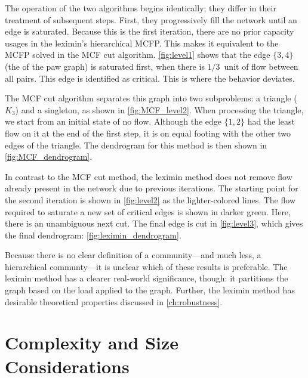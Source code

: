 The operation of the two algorithms begins identically; they differ in their treatment of subsequent steps. First, they progressively fill the network until an edge is saturated. Because this is the first iteration, there are no prior capacity usages in the leximin's hierarchical MCFP. This makes it equivalent to the MCFP solved in the MCF cut algorithm. \autoref{fig:level1} shows that the edge $\{3, 4\}$ (the  of the paw graph) is saturated first, when there is $1/3$~unit of flow between all pairs. This edge is identified as critical. This is where the behavior deviates.

The MCF cut algorithm separates this graph into two subproblems: a triangle ($K_3$) and a singleton, as shown in \autoref{fig:MCF_level2}. When processing the triangle, we start from an initial state of no flow. Although the edge $\{1, 2\}$ had the least flow on it at the end of the first step, it is on equal footing with the other two edges of the triangle. The dendrogram for this method is then shown in \autoref{fig:MCF_dendrogram}.



In contrast to the MCF cut method, the leximin method does not remove flow already present in the network due to previous iterations. The starting point for the second iteration is shown in \autoref{fig:level2} as the lighter-colored lines. The flow required to saturate a new set of critical edges is shown in darker green. Here, there is an unambiguous next cut. The final edge is cut in \autoref{fig:level3}, which gives the final dendrogram: \autoref{fig:leximin_dendrogram}.

Because there is no clear definition of a community---and much less, a hierarchical communty---it is unclear which of these results is preferable. The leximin method has a clearer real-world significance, though: it partitions the graph based on the load applied to the graph. Further, the leximin method has desirable theoretical properties discussed in \autoref{ch:robustness}.


\section{Complexity and Size Considerations} \label{sec:complexity and size}


